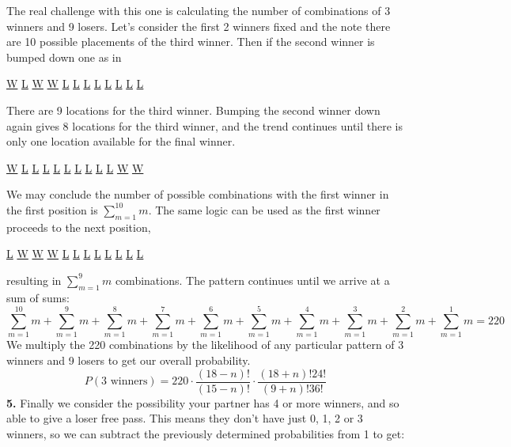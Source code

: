 \documentclass[11pt]{article}
\begin{document}
The real challenge with this one is calculating the number of combinations of 3 winners and 9 losers. Let's consider the first 2 winners fixed and the note there are 10 possible placements of the third winner. Then if the second winner is bumped down one as in
\begin {center}
  \underline{W} \underline{L} \underline{W} \underline{W} \underline{L} \underline{L} \underline{L} \underline{L} \underline{L} \underline{L} \underline{L} \underline{L}\\
  \end{center}
There are 9 locations for the third winner. Bumping the second winner down again gives 8 locations for the third winner, and the trend continues until there is only one location available for the final winner. 
\begin {center}
  \underline{W} \underline{L} \underline{L} \underline{L} \underline{L} \underline{L} \underline{L} \underline{L} \underline{L} \underline{L} \underline{W} \underline{W}\\
  \end{center}
We may conclude the number of possible combinations with the first winner in the first position is $ \displaystyle\sum_{m=1}^{10} m $. The same logic can be used as the first winner proceeds to the next position,
\begin {center}
  \underline{L} \underline{W} \underline{W} \underline{W} \underline{L} \underline{L} \underline{L} \underline{L} \underline{L} \underline{L} \underline{L} \underline{L}\\
  \end{center}
resulting in $ \displaystyle\sum_{m=1}^{9} m $ combinations. The pattern continues until we arrive at a sum of sums:
\begin{equation}
  \displaystyle\sum_{m=1}^{10} m +\displaystyle\sum_{m=1}^{9} m +\displaystyle\sum_{m=1}^{8} m +\displaystyle\sum_{m=1}^{7} m +\displaystyle\sum_{m=1}^{6} m +\displaystyle\sum_{m=1}^{5} m +\displaystyle\sum_{m=1}^{4} m +\displaystyle\sum_{m=1}^{3} m +\displaystyle\sum_{m=1}^{2} m +\displaystyle\sum_{m=1}^{1} m= 220
\end{equation}
We multiply the 220 combinations by the likelihood of any particular pattern of 3 winners and 9 losers to get our overall probability.
\begin {equation} 
P(3 \text{ winners})=220\cdot \frac{(18-n)!}{(15-n)!}\cdot \frac{(18+n)!24!}{(9+n)!36!}
\end{equation}
\indent \textbf{5.} Finally we consider the possibility your partner has 4 or more winners, and so able to give a loser free pass. This means they don't have just 0, 1, 2 or 3 winners, so we can subtract the previously determined probabilities from 1 to get:
\end{document}
